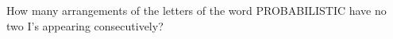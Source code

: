 How many arrangements of the letters of the word PROBABILISTIC have no two I's appearing consecutively?
